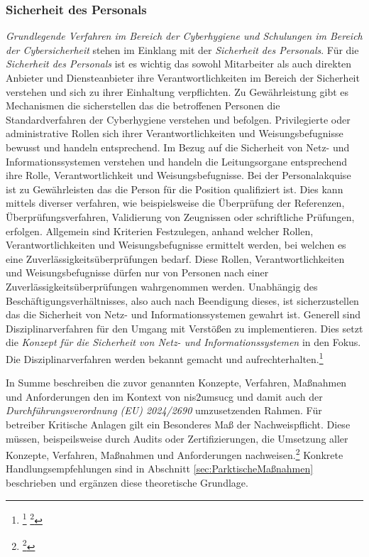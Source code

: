 \documentclass[11pt,a4paper,hidelinks]{article}   %
\begin{document}
            \subsubsection{Sicherheit des Personals}
            \emph{Grundlegende Verfahren im Bereich der Cyberhygiene und Schulungen im Bereich der Cybersicherheit} stehen im Einklang mit der \emph{Sicherheit des Personals}. Für die \emph{Sicherheit des Personals} ist es wichtig das sowohl Mitarbeiter als auch direkten Anbieter und Diensteanbieter ihre Verantwortlichkeiten im Bereich der Sicherheit verstehen und sich zu ihrer Einhaltung verpflichten. Zu Gewährleistung gibt es Mechanismen die sicherstellen das die betroffenen Personen die Standardverfahren der Cyberhygiene verstehen und befolgen. Privilegierte oder administrative Rollen sich ihrer Verantwortlichkeiten und Weisungsbefugnisse bewusst und handeln entsprechend. Im Bezug auf die Sicherheit von Netz- und Informationssystemen verstehen und handeln die Leitungsorgane entsprechend ihre Rolle, Verantwortlichkeit und Weisungsbefugnisse. Bei der Personalakquise ist zu Gewährleisten das die Person für die Position qualifiziert ist. Dies kann mittels diverser verfahren, wie beispielsweise die Überprüfung der Referenzen, Überprüfungsverfahren, Validierung von Zeugnissen oder schriftliche Prüfungen, erfolgen. Allgemein sind Kriterien Festzulegen, anhand welcher Rollen, Verantwortlichkeiten und Weisungsbefugnisse ermittelt werden, bei welchen es eine Zuverlässigkeitsüberprüfungen bedarf. Diese Rollen, Verantwortlichkeiten und Weisungsbefugnisse dürfen nur von Personen nach einer Zuverlässigkeitsüberprüfungen wahrgenommen werden. Unabhängig des Beschäftigungsverhältnisses, also auch nach Beendigung dieses, ist sicherzustellen das die Sicherheit von Netz- und Informationssystemen gewahrt ist. Generell sind Disziplinarverfahren für den Umgang mit Verstößen zu implementieren. Dies setzt die \emph{Konzept für die Sicherheit von Netz- und Informationssystemen} in den Fokus. Die Disziplinarverfahren werden bekannt gemacht und aufrechterhalten.\footnote{
                \footcite[Vgl. Nummer 8,][, Anhang]{EU2024-2690}
                \footcite[Vgl. §30 Absatz 2, Nummer 7 und 9,][]{NIS2UmsuCG} %
            }\medbreak

            In Summe beschreiben die zuvor genannten Konzepte, Verfahren, Maßnahmen und Anforderungen den im Kontext von \gls{nis2umsucg} und damit auch der \emph{Durchführungsverordnung (EU) 2024/2690} umzusetzenden Rahmen. Für betreiber Kritische Anlagen gilt ein Besonderes Maß der Nachweispflicht. Diese müssen, beispeilsweise durch Audits oder Zertifizierungen, die Umsetzung aller Konzepte, Verfahren, Maßnahmen und Anforderungen nachweisen.\footnote{\footcite[Vgl. §39,][]{NIS2UmsuCG}} Konkrete Handlungsempfehlungen sind in Abschnitt \ref{sec:ParktischeMaßnahmen} beschrieben und ergänzen diese theoretische Grundlage.
            
\end{document}
